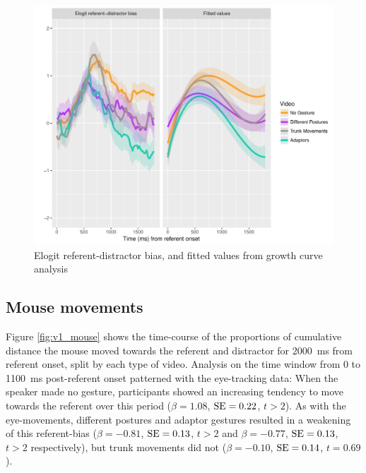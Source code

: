\documentclass[a4paper,man,natbib]{apa6}
\newcommand{\resultsLM}[3]{$\beta = #1$, $\textnormal{SE} = #2$, $t #3$}
\begin{document}
\begin{figure}[Ht]
  \centering
	\includegraphics[width=\linewidth]{./img/e7_gcamodel.pdf}
  \caption{Elogit referent-distractor bias, and fitted values from growth curve analysis}
  \label{fig:v1_gca}
\end{figure}


\subsection{Mouse movements}
Figure \ref{fig:v1_mouse} shows the time-course of the proportions of cumulative distance the mouse moved towards the referent and distractor for 2000~ms from referent onset, split by each type of video.
Analysis on the time window from 0 to 1100~ms post-referent onset patterned with the eye-tracking data:
When the speaker made no gesture, participants showed an increasing tendency to move towards the referent over this period (\resultsLM{1.08}{0.22}{>2}).
As with the eye-movements, different postures and adaptor gestures resulted in a weakening of this referent-bias (\resultsLM{-0.81}{0.13}{>2} and \resultsLM{-0.77}{0.13}{>2} respectively), but trunk movements did not (\resultsLM{-0.10}{0.14}{=0.69}). 
\end{document}
